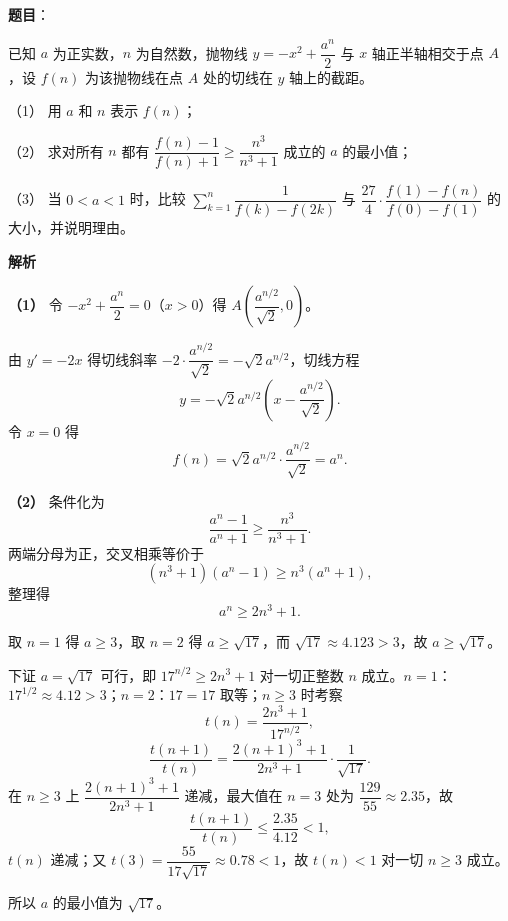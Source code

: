 \begin{answer}

\textbf{题目}：

已知 $a$ 为正实数，$n$ 为自然数，抛物线 $y=-x^2+\dfrac{a^n}2$ 与 $x$ 轴正半轴相交于点 $A$，设 $f(n)$ 为该抛物线在点 $A$ 处的切线在 $y$ 轴上的截距。

（1） 用 $a$ 和 $n$ 表示 $f(n)$；

（2） 求对所有 $n$ 都有 $\dfrac{f(n)-1}{f(n)+1}\geqslant\dfrac{n^3}{n^3+1}$ 成立的 $a$ 的最小值；

（3） 当 $0<a<1$ 时，比较 $\sum\limits_{k=1}^{n}\dfrac1{f(k)-f(2k)}$ 与 $\dfrac{27}4\cdot\dfrac{f(1)-f(n)}{f(0)-f(1)}$ 的大小，并说明理由。

\textbf{解析}

\textbf{（1）} 令 $-x^2+\dfrac{a^n}2=0$（$x>0$）得 $A\left(\dfrac{a^{n/2}}{\sqrt2},0\right)$。

由 $y'=-2x$ 得切线斜率 $-2\cdot\dfrac{a^{n/2}}{\sqrt2}=-\sqrt2a^{n/2}$，切线方程
\nopagebreak[4]
\[y=-\sqrt2a^{n/2}\left(x-\frac{a^{n/2}}{\sqrt2}\right).\]
令 $x=0$ 得
\nopagebreak[4]
\[f(n)=\sqrt2a^{n/2}\cdot\frac{a^{n/2}}{\sqrt2}=a^n.\]

\textbf{（2）} 条件化为
\nopagebreak[4]
\[\frac{a^n-1}{a^n+1}\geqslant\frac{n^3}{n^3+1}.\]
两端分母为正，交叉相乘等价于
\nopagebreak[4]
\[\left(n^3+1\right)\left(a^n-1\right)\geqslant n^3\left(a^n+1\right),\]
整理得
\nopagebreak[4]
\[a^n\geqslant2n^3+1.\]

取 $n=1$ 得 $a\geqslant3$，取 $n=2$ 得 $a\geqslant\sqrt{17}$，而 $\sqrt{17}\approx4.123>3$，故 $a\geqslant\sqrt{17}$。

下证 $a=\sqrt{17}$ 可行，即 $17^{n/2}\geqslant2n^3+1$ 对一切正整数 $n$ 成立。$n=1$：$17^{1/2}\approx4.12>3$；$n=2$：$17=17$ 取等；$n\geqslant3$ 时考察
\nopagebreak[4]
\[t(n)=\frac{2n^3+1}{17^{n/2}},\]
\nopagebreak[4]
\[\frac{t(n+1)}{t(n)}=\frac{2(n+1)^3+1}{2n^3+1}\cdot\frac1{\sqrt{17}}.\]
在 $n\geqslant3$ 上 $\dfrac{2(n+1)^3+1}{2n^3+1}$ 递减，最大值在 $n=3$ 处为 $\dfrac{129}{55}\approx2.35$，故
\nopagebreak[4]
\[\frac{t(n+1)}{t(n)}\leqslant\frac{2.35}{4.12}<1,\]
$t(n)$ 递减；又 $t(3)=\dfrac{55}{17\sqrt{17}}\approx0.78<1$，故 $t(n)<1$ 对一切 $n\geqslant3$ 成立。

所以 $a$ 的最小值为 $\sqrt{17}$。


\end{answer}
